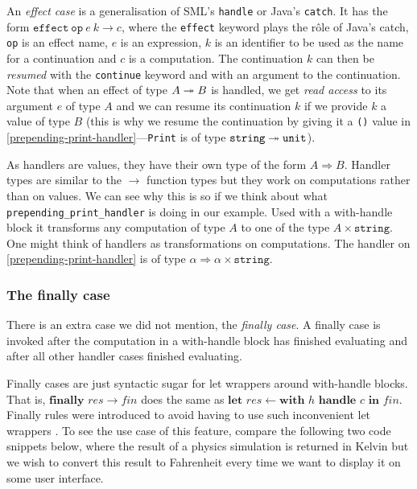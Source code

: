 \documentclass[class=article, crop=false]{standalone}
\begin{document}
An \emph{effect case} is a generalisation of SML's \verb|handle| or Java's
\verb|catch|. It has the form $\mathtt{effect}\ \mathtt{op}\ e\ k \to c$, where
the \texttt{effect} keyword plays the rôle of Java's catch, \texttt{op} is an
effect name, $e$ is an expression, $k$ is an identifier to be used as the name
for a continuation and $c$ is a computation. The continuation $k$ can then be
\emph{resumed} with the \verb|continue| keyword and with an argument to the
continuation. Note that when an effect of type $A \twoheadrightarrow B$ is handled, we get
\emph{read access} to its argument $e$ of type $A$ and we can resume its
continuation $k$ if we provide $k$ a value of type $B$ (this is why we resume
the continuation by giving it a \lstinline{()} value in
\autoref{prepending-print-handler}---\lstinline{Print} is of type
$\mathtt{string} \twoheadrightarrow \mathtt{unit}$).

As handlers are values, they have their own type of the form $A \Rightarrow B$.
Handler types are similar to the $\to$ function types but they work on
computations rather than on values. We can see why this is so if we think about
what \lstinline|prepending_print_handler| is doing in our example. Used with a
with-handle block it transforms any computation of type $A$ to one of the type
$A \times \mathtt{string}$. One might think of handlers as transformations on
computations. The handler on \autoref{prepending-print-handler} is of type
$\alpha \Rightarrow \alpha \times \mathtt{string}$.

\subsubsection{The finally case}

There is an extra case we did not mention, the \emph{finally case}. A finally
case is invoked after the computation in a with-handle block has finished
evaluating and after all other handler cases finished evaluating.

Finally cases are just syntactic sugar for let wrappers around with-handle blocks.
That is, $\textbf{finally } \mathit{res} \to \mathit{fin}$ does the same as
$\textbf{let } \mathit{res} \leftarrow \textbf{with } h \textbf{ handle } c
\textbf{ in } \mathit{fin}$.
Finally rules were introduced to avoid having to use such inconvenient let
wrappers \cite{bauer2015programming}. To see the use case of this feature,
compare the following two code snippets below, where the result of a physics
simulation is returned in Kelvin but we wish to convert this result to
Fahrenheit every time we want to display it on some user interface.
\end{document}
